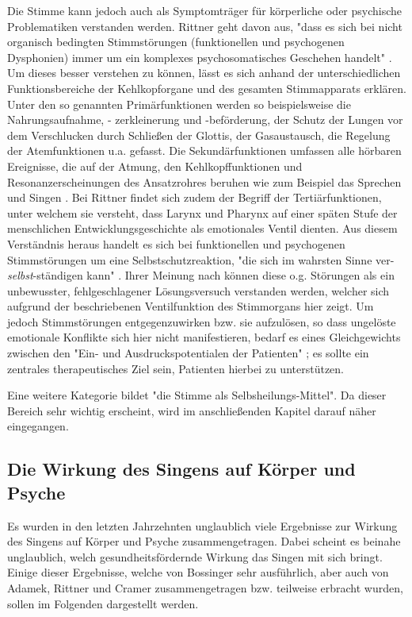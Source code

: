 Die Stimme kann jedoch auch als Symptomträger für körperliche oder psychische Problematiken verstanden werden. Rittner geht davon aus, "dass es sich bei nicht organisch bedingten Stimmstörungen (funktionellen und psychogenen Dysphonien) immer um ein komplexes psychosomatisches Geschehen handelt" \autocite[212f.]{rittner2008}. Um dieses besser verstehen zu können, lässt es sich anhand der unterschiedlichen Funktionsbereiche der Kehlkopforgane und des gesamten Stimmapparats erklären. Unter den so genannten Primärfunktionen werden so beispielsweise die Nahrungsaufnahme, - zerkleinerung und -beförderung, der Schutz der Lungen vor dem Verschlucken durch Schließen der Glottis, der Gasaustausch, die Regelung der Atemfunktionen u.a. gefasst. Die Sekundärfunktionen umfassen alle hörbaren Ereignisse, die auf der Atmung, den Kehlkopffunktionen und Resonanzerscheinungen des Ansatzrohres beruhen wie zum Beispiel das Sprechen und Singen . Bei Rittner findet sich zudem der Begriff der Tertiärfunktionen, unter welchem sie versteht, dass Larynx und Pharynx auf einer späten Stufe der menschlichen Entwicklungsgeschichte als emotionales Ventil dienten. Aus diesem Verständnis heraus handelt es sich bei funktionellen und psychogenen Stimmstörungen um eine Selbstschutzreaktion, "die sich im wahrsten Sinne ver-\emph{selbst}-ständigen kann" \autocite[213]{rittner2008}. Ihrer Meinung nach können diese o.g. Störungen als ein unbewusster, fehlgeschlagener Lösungsversuch verstanden werden, welcher sich aufgrund der beschriebenen Ventilfunktion des Stimmorgans hier zeigt. Um jedoch Stimmstörungen entgegenzuwirken bzw. sie aufzulösen, so dass ungelöste emotionale Konflikte sich hier nicht manifestieren, bedarf es eines Gleichgewichts zwischen den "Ein- und Ausdruckspotentialen der Patienten" \autocite[64]{rittner2012}; es sollte ein zentrales therapeutisches Ziel sein, Patienten hierbei zu unterstützen. 

Eine weitere Kategorie bildet "die Stimme als Selbsheilungs-Mittel". Da dieser Bereich sehr wichtig erscheint, wird im anschließenden Kapitel darauf näher eingegangen.

\subsection{Die Wirkung des Singens auf Körper und Psyche} 
Es wurden in den letzten Jahrzehnten unglaublich viele Ergebnisse zur Wirkung des Singens auf Körper und Psyche zusammengetragen. Dabei scheint es beinahe unglaublich, welch gesundheitsfördernde Wirkung das Singen mit sich bringt.
Einige dieser Ergebnisse, welche von Bossinger sehr ausführlich, aber auch von Adamek, Rittner und Cramer zusammengetragen bzw. teilweise erbracht wurden, sollen im Folgenden dargestellt werden.

